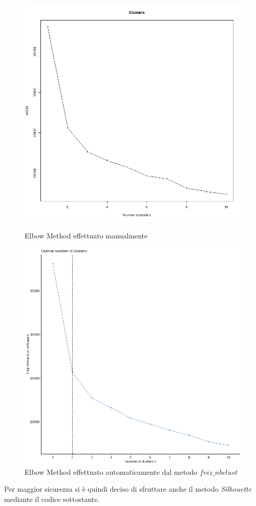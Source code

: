 \documentclass[letterpaper,11pt]{article}
\begin{document}
\begin{figure}[H]
   \begin{minipage}{0.48\textwidth}
     \centering
     \includegraphics[width=1\linewidth]{Img/K-MEANS/KMEANS001.png}
     \caption{Elbow Method effettuato manualmente}\label{fig:Elbow1}
   \end{minipage}\hfill
   \begin{minipage}{0.48\textwidth}
     \centering
     \includegraphics[width=1\linewidth]{Img/K-MEANS/KMEANS002.png}
     \caption{Elbow Method effettuato automaticamente dal metodo $fviz\_nbclust$}\label{fig:Elbow2}
   \end{minipage}
\end{figure}
Per maggior sicurezza si è quindi deciso di sfruttare anche il metodo \textit{Silhouette} mediante il codice sottostante.
\end{document}
